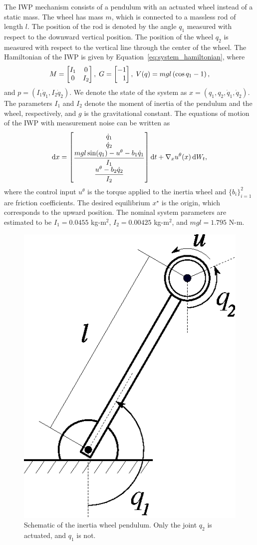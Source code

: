The IWP mechanism consists of a pendulum with an actuated wheel instead of a
static mass.
%
The wheel has mass $m$, which is connected to a massless rod of length \(l\). 
%
The position of the rod is denoted by the angle \(q_1\) measured with
respect to the downward vertical position.
%
The position of the wheel \(q_2\) is measured with respect to the vertical
line through the center of the wheel.
%
The Hamiltonian of the IWP is given by Equation~\eqref{eq:system_hamiltonian}, where
%
\begin{equation*}
    M = \begin{bmatrix}I_1 & 0 \\ 0 & I_2\end{bmatrix},
    \;
    G = \begin{bmatrix}-1 \\ \phantom{-}1\end{bmatrix},
    \;
    V(q) = mgl \left( \cos q_1 - 1 \right),
\end{equation*}
%
and $p = \left(I_1 \dot{q}_1,I_2 \dot{q}_2\right)$. 
%
We denote the state of the system as $x = (q_1, q_2, \dot{q}_1, \dot{q}_2)$.
%
The parameters \(I_1\) and \(I_2\) denote the moment of inertia of the pendulum
and the wheel, respectively, and \(g\) is the gravitational constant.
%
The equations of motion of the IWP with measurement noise can be written as 
%
\begin{equation}
    \operatorname{d}\! x = \begin{bmatrix}\dot{q}_1 \\ \dot{q}_2 \\ \dfrac{mgl \sin(q_1) - u^\theta - b_1\dot{q}_1}{I_1} \\ \dfrac{u^\theta - b_2 \dot{q}_2}{I_2}\end{bmatrix} \operatorname{d}\! t + \nabla_x u^\theta(x) \operatorname{d}\! W_t, 
    \label{eq:iwp_dynamics}
\end{equation}
%
where the control input \(u^\theta\) is the torque applied to the inertia wheel
and $\{b_i\}_{i=1}^2$ are friction coefficients.
%
The desired equilibrium $x^\star$ is the origin, which corresponds to the upward
position.
%
The nominal system parameters are estimated to be $I_1 = 0.0455$ kg-m$^2$, $I_2
= 0.00425$ kg-m$^2$, and $mgl = 1.795$ N-m. 
%
%

\begin{figure}[t]
    \centering
    \includegraphics[width=0.25\linewidth]{figures/iwp.eps}
    \caption{Schematic of the inertia wheel pendulum. Only the joint $q_2$ is actuated, and $q_1$ is not.}
    \label{fig:iwp}
\end{figure}

